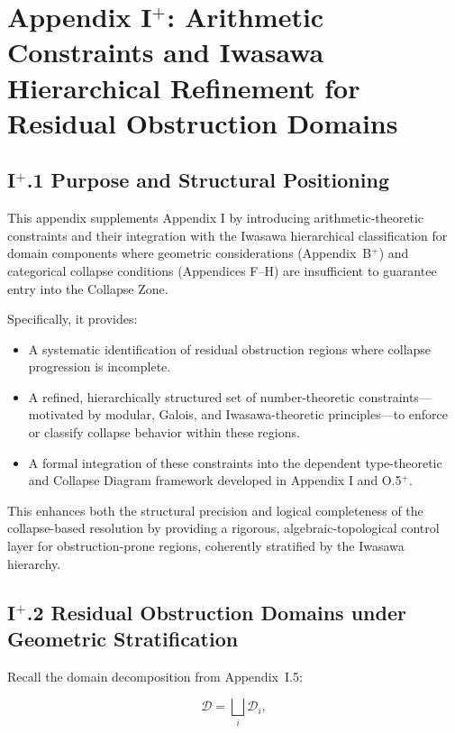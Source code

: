 \documentclass[11pt]{article}
\begin{document}
\section*{Appendix I$^{+}$: Arithmetic Constraints and Iwasawa Hierarchical Refinement for Residual Obstruction Domains}

\subsection*{I$^{+}$.1 Purpose and Structural Positioning}

This appendix supplements Appendix I by introducing arithmetic-theoretic constraints and their integration with the Iwasawa hierarchical classification for domain components where geometric considerations (Appendix~B$^{+}$) and categorical collapse conditions (Appendices F–H) are insufficient to guarantee entry into the Collapse Zone.

Specifically, it provides:

\begin{itemize}
  \item A systematic identification of residual obstruction regions where collapse progression is incomplete.
  \item A refined, hierarchically structured set of number-theoretic constraints—motivated by modular, Galois, and Iwasawa-theoretic principles—to enforce or classify collapse behavior within these regions.
  \item A formal integration of these constraints into the dependent type-theoretic and Collapse Diagram framework developed in Appendix I and O.5$^{+}$.
\end{itemize}

This enhances both the structural precision and logical completeness of the collapse-based resolution by providing a rigorous, algebraic-topological control layer for obstruction-prone regions, coherently stratified by the Iwasawa hierarchy.

\subsection*{I$^{+}$.2 Residual Obstruction Domains under Geometric Stratification}

Recall the domain decomposition from Appendix~I.5:

\[
\mathcal{D} = \bigsqcup_i \mathcal{D}_i,
\]
\end{document}
